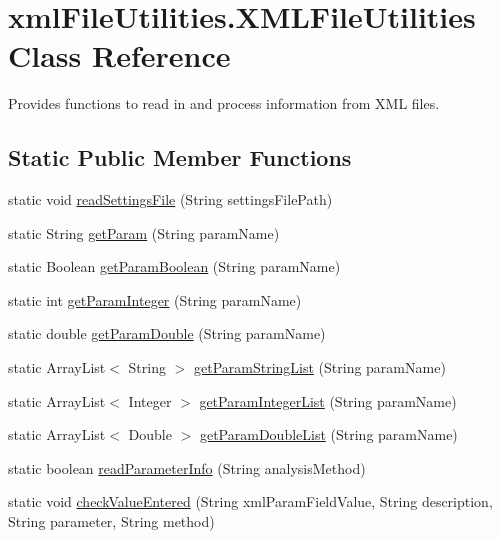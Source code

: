 \hypertarget{classxmlFileUtilities_1_1XMLFileUtilities}{}\section{xml\+File\+Utilities.\+X\+M\+L\+File\+Utilities Class Reference}
\label{classxmlFileUtilities_1_1XMLFileUtilities}


Provides functions to read in and process information from X\+M\+L files.  


\subsection*{Static Public Member Functions}
\begin{DoxyCompactItemize}
\item 
static void \hyperlink{classxmlFileUtilities_1_1XMLFileUtilities_a8b8c45e8f1fec8417f4843df35a9bd26}{read\+Settings\+File} (String settings\+File\+Path)
\item 
static String \hyperlink{classxmlFileUtilities_1_1XMLFileUtilities_a4983f89700a65cf368e50c15f7da1057}{get\+Param} (String param\+Name)
\item 
static Boolean \hyperlink{classxmlFileUtilities_1_1XMLFileUtilities_a725f36019222164d5a024a4658ef7573}{get\+Param\+Boolean} (String param\+Name)
\item 
static int \hyperlink{classxmlFileUtilities_1_1XMLFileUtilities_a3027a3086dab10e1605ec36d0a15c13b}{get\+Param\+Integer} (String param\+Name)
\item 
static double \hyperlink{classxmlFileUtilities_1_1XMLFileUtilities_afea2fe3c4e33a4379f4beda19fa98998}{get\+Param\+Double} (String param\+Name)
\item 
static Array\+List$<$ String $>$ \hyperlink{classxmlFileUtilities_1_1XMLFileUtilities_a1ce237ed88984186f55fec221899b56e}{get\+Param\+String\+List} (String param\+Name)
\item 
static Array\+List$<$ Integer $>$ \hyperlink{classxmlFileUtilities_1_1XMLFileUtilities_a49faaf9bf92fda538a5f93b60a0f210f}{get\+Param\+Integer\+List} (String param\+Name)
\item 
static Array\+List$<$ Double $>$ \hyperlink{classxmlFileUtilities_1_1XMLFileUtilities_afb36ff9d3a94c182419e2234d66b6854}{get\+Param\+Double\+List} (String param\+Name)
\item 
static boolean \hyperlink{classxmlFileUtilities_1_1XMLFileUtilities_a33c3a2f0676929c537236aec9dd2e301}{read\+Parameter\+Info} (String analysis\+Method)
\item 
static void \hyperlink{classxmlFileUtilities_1_1XMLFileUtilities_a0e970d95c0631fb119f9978782e204c6}{check\+Value\+Entered} (String xml\+Param\+Field\+Value, String description, String parameter, String method)
\end{DoxyCompactItemize}
